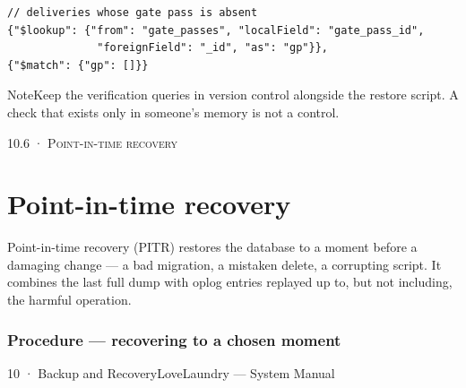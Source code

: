 \documentclass[11pt,a4paper,oneside]{book}
\begin{document}
\begin{verbatim}
// deliveries whose gate pass is absent
{"$lookup": {"from": "gate_passes", "localField": "gate_pass_id",
              "foreignField": "_id", "as": "gp"}},
{"$match": {"gp": []}}
\end{verbatim}
\begin{notebox}NoteKeep the verification queries in version control alongside the restore script. A check that exists only in someone's memory is not a control.\end{notebox}
\textsc{\small\color{crimson}10.6 · Point-in-time recovery}\par\medskip
\section*{Point-in-time recovery}
Point-in-time recovery (PITR) restores the database to a moment before a damaging change — a bad migration, a mistaken delete, a corrupting script. It combines the last full dump with oplog entries replayed up to, but not including, the harmful operation.

\subsubsection*{Procedure — recovering to a chosen moment}
10 · Backup and RecoveryLoveLaundry — System Manual
\end{document}
